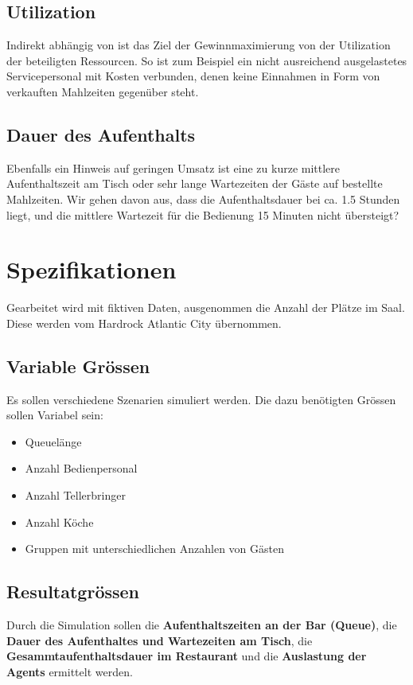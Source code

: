 \documentclass[ngerman,a4paper,12pt]{scrreprt}
\begin{document}
	\subsection{Utilization}
	Indirekt abhängig von ist das Ziel der Gewinnmaximierung von der Utilization der beteiligten Ressourcen. So ist zum Beispiel ein nicht ausreichend ausgelastetes Servicepersonal mit Kosten verbunden, denen keine Einnahmen in Form von verkauften Mahlzeiten gegenüber steht.
	  
	\subsection{Dauer des Aufenthalts}
		Ebenfalls ein Hinweis auf geringen Umsatz ist eine zu kurze mittlere Aufenthaltszeit am Tisch oder sehr lange Wartezeiten der Gäste auf bestellte Mahlzeiten. Wir gehen davon aus, dass die Aufenthaltsdauer bei ca. 1.5 Stunden liegt, und die mittlere Wartezeit für die Bedienung 15 Minuten nicht übersteigt? 

\section{Spezifikationen}
	Gearbeitet wird mit fiktiven Daten, ausgenommen die Anzahl der Plätze im Saal. Diese werden vom Hardrock Atlantic City übernommen.

	\subsection{Variable Grössen}
		Es sollen verschiedene Szenarien simuliert werden. Die dazu benötigten Grössen sollen Variabel sein:
		\begin{itemize}
			\item Queuelänge
			\item Anzahl Bedienpersonal
			\item Anzahl Tellerbringer
			\item Anzahl Köche
			\item Gruppen mit unterschiedlichen Anzahlen von Gästen
		\end{itemize}

	\subsection{Resultatgrössen}
		Durch die Simulation sollen die \textbf{Aufenthaltszeiten an der Bar (Queue)}, die \textbf{Dauer des Aufenthaltes und Wartezeiten am Tisch}, die \textbf{Gesammtaufenthaltsdauer im Restaurant} und die \textbf{Auslastung der Agents} ermittelt werden.
\end{document}
